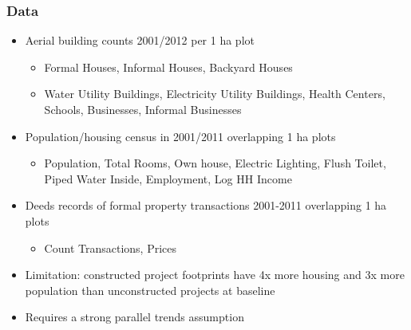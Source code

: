 \documentclass[aspectratio=32]{beamer}
\begin{document}
\begin{frame}
\frametitle{Data}

\centering
\begin{itemize}
\item Aerial building counts 2001/2012 per 1 ha plot
  \begin{itemize}
    \item Formal Houses, Informal Houses, Backyard Houses
    \item Water Utility Buildings, Electricity Utility Buildings, Health Centers, Schools, Businesses, Informal Businesses
  \end{itemize}
  \vspace{2mm}
\item Population/housing census in 2001/2011 overlapping 1 ha plots
  \begin{itemize}
    \item Population, Total Rooms, Own house, Electric Lighting, Flush Toilet, Piped Water Inside, Employment, Log HH Income
  \end{itemize}
    \vspace{2mm}
\item Deeds records of formal property transactions 2001-2011 overlapping 1 ha plots
  \begin{itemize}
    \item Count Transactions, Prices
  \end{itemize}
    \vspace{2mm}
\vspace{5mm}
\item Limitation: constructed project footprints have 4x more housing and 3x more population than unconstructed projects at baseline
\item Requires a strong parallel trends assumption
\end{itemize}



\end{frame}
\end{document}

